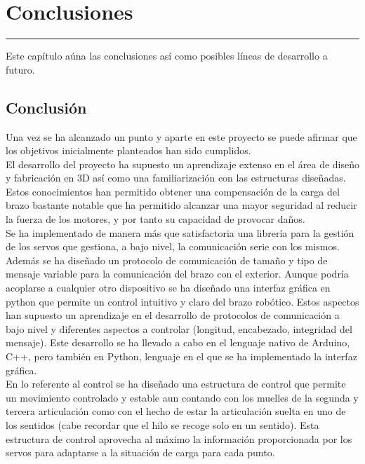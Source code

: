 \chapter{Conclusiones} \label{chap:Conclusiones}
\hrule
\vspace{3mm}

Este capítulo aúna las conclusiones así como posibles líneas de desarrollo a futuro.

\section{Conclusión} \label{sec:Conclusiones:Conclusion}

Una vez se ha alcanzado un punto y aparte en este proyecto se puede afirmar que los objetivos inicialmente planteados han sido cumplidos.
\\

El desarrollo del proyecto ha supuesto un aprendizaje extenso en el área de diseño y fabricación en 3D así como una familiarización con las estructuras diseñadas. Estos conocimientos han permitido obtener una compensación de la carga del brazo bastante notable que ha permitido alcanzar una mayor seguridad al reducir la fuerza de los motores, y por tanto su capacidad de provocar daños.
\\

Se ha implementado de manera más que satisfactoria una librería para la gestión de los servos que gestiona, a bajo nivel, la comunicación serie con los mismos. Además se ha diseñado un protocolo de comunicación de tamaño y tipo de mensaje variable para la comunicación del brazo con el exterior. Aunque podría acoplarse a cualquier otro dispositivo se ha diseñado una interfaz gráfica en python que permite un control intuitivo y claro del brazo robótico. Estos aspectos han supuesto un aprendizaje en el desarrollo de protocolos de comunicación a bajo nivel y diferentes aspectos a controlar (longitud, encabezado, integridad del mensaje). Este desarrollo se ha llevado a cabo en el lenguaje nativo de Arduino, C++, pero también en Python, lenguaje en el que se ha implementado la interfaz gráfica.
\\

En lo referente al control se ha diseñado una estructura de control que permite un movimiento controlado  y estable aun contando con los muelles de la segunda y tercera articulación como con el hecho de estar la articulación suelta en  uno de los sentidos (cabe recordar que el hilo se recoge solo en un sentido). Esta estructura de control aprovecha al máximo la información proporcionada por los servos para adaptarse a la situación de carga para cada punto.
\\

